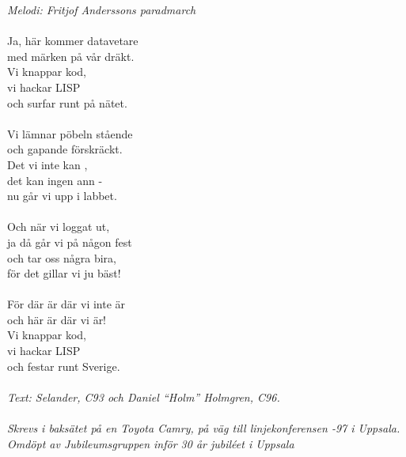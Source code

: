{\footnotesize\textit{Melodi: Fritjof Anderssons paradmarch}}\\
\\
Ja, här kommer datavetare\\
med märken på vår dräkt.\\
Vi knappar kod, \\
vi hackar LISP\\
och surfar runt på nätet.\\
\\
Vi lämnar pöbeln stående\\
och gapande förskräckt.\\
Det vi inte kan , \\
det kan ingen ann -\\
nu går vi upp i labbet.\\
\\
Och när vi loggat ut,\\
ja då går vi på någon fest\\
och tar oss några bira,\\
för det gillar vi ju bäst!\\
\\
För där är där vi inte är\\
och här är där vi är!\\
Vi knappar kod,\\
vi hackar LISP\\
och festar runt Sverige.\\
\\
{\footnotesize\textit{Text: Selander, C93 och Daniel ``Holm''
    Holmgren, C96.\\ \\ Skrevs i baksätet på en Toyota Camry, på väg
    till linjekonferensen -97 i Uppsala. Omdöpt av Jubileumsgruppen
    inför 30 år jubiléet i Uppsala}}
